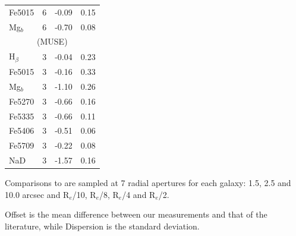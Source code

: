 \begin{table}
\begin{threeparttable}
\begin{tabular}{l r r r}
			Fe5015 		& 6 		& -0.09		& 0.15	\\
			Mg$_b$ 		& 6 		& -0.70		& 0.08	\\
			\hline
			\multicolumn{4}{c}{\citet{Ogando2008} (MUSE)} \\
			\hline
			H$_\beta$ 	& 3 		& -0.04		& 0.23	\\ 
			Fe5015 		& 3 		& -0.16		& 0.33	\\ 
			Mg$_b$ 		& 3 		& -1.10		& 0.26	\\
			Fe5270 		& 3 		& -0.66		& 0.16	\\
			Fe5335 		& 3 		& -0.66		& 0.11	\\
			Fe5406 		& 3 		& -0.51		& 0.06	\\
			Fe5709 		& 3 		& -0.22		& 0.08	\\
			NaD 		& 3 		& -1.57		& 0.16	\\
			\hline
			\hline
		\end{tabular}
		\begin{tablenotes}
		\footnotesize
		\item Comparisons to \citet{Rampazzo2005} are sampled at 7 radial apertures for each galaxy: 1.5, 2.5 and 10.0 arcsec and R$_e$/10, R$_e$/8, R$_e$/4 and R$_e$/2. 
		\item Offset is the mean difference between our measurements and that of the literature, while Dispersion is the standard deviation.
		\end{tablenotes}
	\end{threeparttable}
	\end{table}


